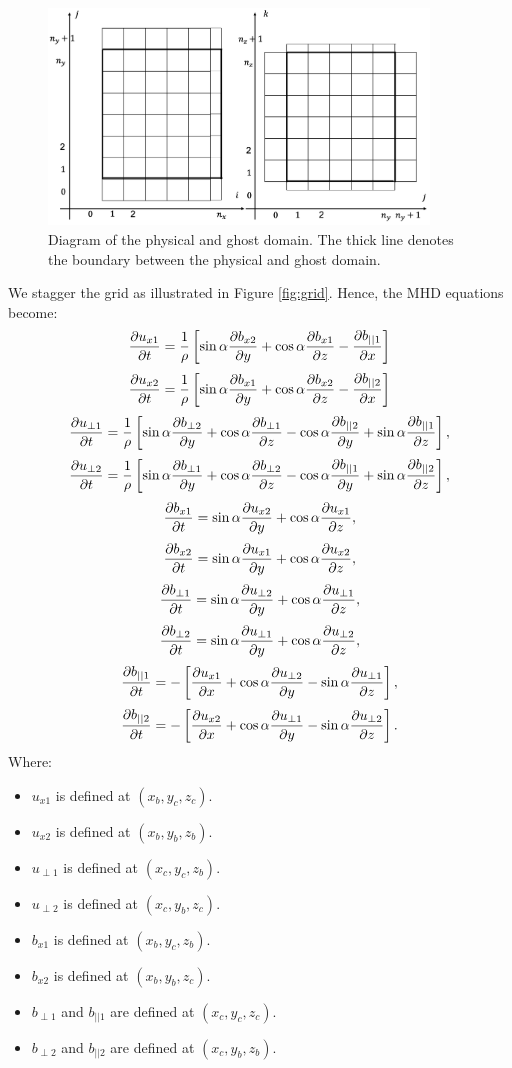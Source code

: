 \documentclass{article}
\begin{document}
\begin{figure}[!htp]
    \centering
    \includegraphics[width=0.9\textwidth]{grid2_2.png}
    \caption{Diagram of the physical and ghost domain. The thick line denotes the boundary between the physical and ghost domain.}
    \label{fig:grid2}
\end{figure}

We stagger the grid as illustrated in Figure \ref{fig:grid}. Hence, the MHD equations become:
\[\pdv{u_{x1}}{t}=\frac{1}{\rho}\left[\sin\alpha\pdv{b_{x2}}{y}+\cos\alpha\pdv{b_{x1}}{z} - \pdv{b_{||1}}{x}\right]\]
\[\pdv{u_{x2}}{t}=\frac{1}{\rho}\left[\sin\alpha\pdv{b_{x1}}{y}+\cos\alpha\pdv{b_{x2}}{z} - \pdv{b_{||2}}{x}\right]\]
\[\pdv{u_{\perp1}}{t}=\frac{1}{\rho}\left[\sin\alpha\pdv{b_{\perp2}}{y}+\cos\alpha\pdv{b_{\perp1}}{z}-\cos\alpha\pdv{b_{||2}}{y}+\sin\alpha\pdv{b_{||1}}{z}\right],\]
\[\pdv{u_{\perp2}}{t}=\frac{1}{\rho}\left[\sin\alpha\pdv{b_{\perp1}}{y}+\cos\alpha\pdv{b_{\perp2}}{z}-\cos\alpha\pdv{b_{||1}}{y}+\sin\alpha\pdv{b_{||2}}{z}\right],\]
\[\pdv{b_{x1}}{t}=\sin\alpha\pdv{u_{x2}}{y}+\cos\alpha\pdv{u_{x1}}{z},\]
\[\pdv{b_{x2}}{t}=\sin\alpha\pdv{u_{x1}}{y}+\cos\alpha\pdv{u_{x2}}{z},\]
\[\pdv{b_{\perp1}}{t}=\sin\alpha\pdv{u_{\perp2}}{y}+\cos\alpha\pdv{u_{\perp1}}{z},\]
\[\pdv{b_{\perp2}}{t}=\sin\alpha\pdv{u_{\perp1}}{y}+\cos\alpha\pdv{u_{\perp2}}{z},\]
\[\pdv{b_{||1}}{t}=-\left[\pdv{u_{x1}}{x}+\cos\alpha\pdv{u_{\perp2}}{y}-\sin\alpha\pdv{u_{\perp1}}{z}\right],\]
\[\pdv{b_{||2}}{t}=-\left[\pdv{u_{x2}}{x}+\cos\alpha\pdv{u_{\perp1}}{y}-\sin\alpha\pdv{u_{\perp2}}{z}\right].\]
Where:
\begin{itemize}
    \item $u_{x1}$ is defined at $(x_b,y_c,z_c)$.
    \item $u_{x2}$ is defined at $(x_b,y_b,z_b)$.
    \item $u_{\perp1}$ is defined at $(x_c,y_c,z_b)$.
    \item $u_{\perp2}$ is defined at $(x_c,y_b,z_c)$.
    \item $b_{x1}$ is defined at $(x_b,y_c,z_b)$.
    \item $b_{x2}$ is defined at $(x_b,y_b,z_c)$.
    \item $b_{\perp1}$ and $b_{||1}$ are defined at $(x_c,y_c,z_c)$.
    \item $b_{\perp2}$ and $b_{||2}$ are defined at $(x_c,y_b,z_b)$.
\end{itemize}
\end{document}
